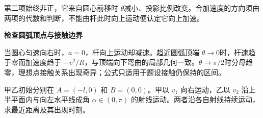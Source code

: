 \begin{solution}
第二项始终非正，它来自圆心前移时 $\theta$减小、投影比例改变。合加速度的方向须由两项的代数和判断，不能由杆此时向上运动便认定它向上加速。



\par\medskip{}\noindent\textbf{检查圆弧顶点与接触边界}\par\nobreak
当圆心匀速向右时，$a=0$，杆向上运动却减速。趋近圆弧顶端 $\theta\to0$时，杆速趋于零而加速度趋于 $-v^2/R$，与顶端向下弯曲的局部几何一致。$\theta\to\pi/2$时分母趋零，理想点接触关系出现奇异；公式只适用于题设接触仍保持的区间。\end{solution}

\begin{question}\begin{example}[沿不同射线运动的最近距离]\label{k3p6}
甲乙初始分别在 $A=(-l,0)$ 和 $B=(0,0)$。甲以 $v_1$ 向右运动，乙以 $v_2$ 沿上半平面内与向左水平线成角 $\alpha\in(0,\pi)$ 的射线运动。两者沿各自射线持续运动，求最近距离及其出现时刻。\end{example}
\end{question}
